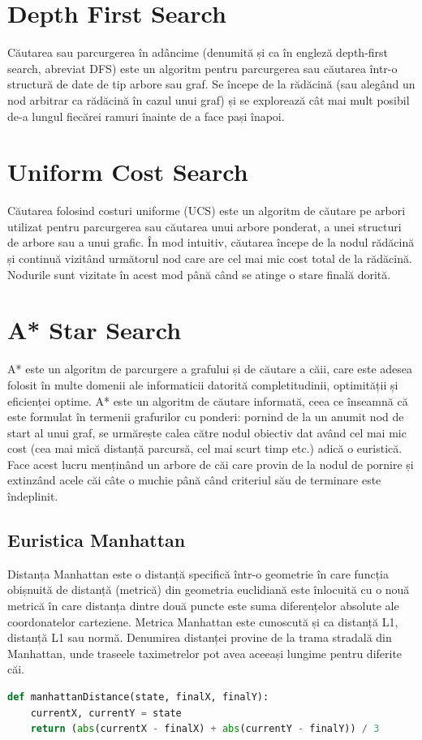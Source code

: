 \documentclass[a4paper,12pt]{report}
\begin{document}
\section{Depth First Search}
Căutarea sau parcurgerea în adâncime (denumită și ca în engleză depth-first search, abreviat DFS) este un algoritm pentru parcurgerea sau căutarea într-o structură de date de tip arbore sau graf. Se începe de la rădăcină (sau alegând un nod arbitrar ca rădăcină în cazul unui graf) și se explorează cât mai mult posibil de-a lungul fiecărei ramuri înainte de a face pași înapoi.
\section{Uniform Cost Search}
Căutarea folosind costuri uniforme (UCS) este un algoritm de căutare pe arbori utilizat pentru parcurgerea sau căutarea unui arbore ponderat, a unei structuri de arbore sau a unui grafic. În mod intuitiv, căutarea începe de la nodul rădăcină și continuă vizitând următorul nod care are cel mai mic cost total de la rădăcină. Nodurile sunt vizitate în acest mod până când se atinge o stare finală dorită.
\section{A* Star Search}
A* este un algoritm de parcurgere a grafului și de căutare a căii, care este adesea folosit în multe domenii ale informaticii datorită completitudinii, optimității și eficienței optime.
A* este un algoritm de căutare informată, ceea ce înseamnă că este formulat în termenii grafurilor cu ponderi: pornind de la un anumit nod de start al unui graf, se urmărește calea către nodul obiectiv dat având cel mai mic cost (cea mai mică distanță parcursă, cel mai scurt timp etc.) adică o euristică. Face acest lucru menținând un arbore de căi care provin de la nodul de pornire și extinzând acele căi câte o muchie până când criteriul său de terminare este îndeplinit.
 \subsection{Euristica Manhattan}
 Distanța Manhattan este o distanță specifică într-o geometrie în care funcția obișnuită de distanță (metrică) din geometria euclidiană este înlocuită cu o nouă metrică în care distanța dintre două puncte este suma diferențelor absolute ale coordonatelor carteziene. Metrica Manhattan este cunoscută și ca distanță L1, distanță L1 sau normă. Denumirea distanței provine de la trama stradală din Manhattan, unde traseele taximetrelor pot avea aceeași lungime pentru diferite căi.
  \begin{lstlisting}[language=Python]
def manhattanDistance(state, finalX, finalY):
    currentX, currentY = state
    return (abs(currentX - finalX) + abs(currentY - finalY)) / 3
\end{lstlisting}
\end{document}
